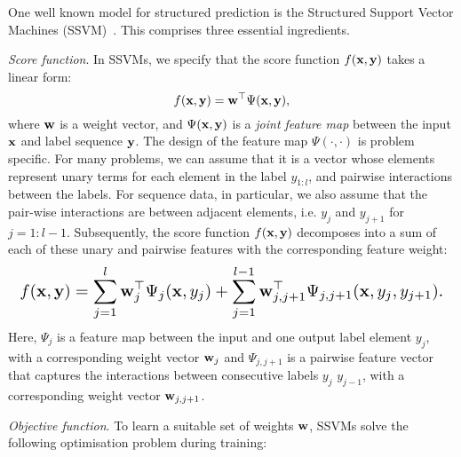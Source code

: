 One well known model for structured prediction is the Structured Support Vector Machines (SSVM)~\cite{joachims2009predicting,tsochantaridis2005large}.
This comprises three essential ingredients.

\emph{Score function}. In SSVMs, we specify that the score function $f(\mathbf{x}, \mathbf{y})$ takes a linear form:
\begin{equation*}
f(\mathbf{x}, \mathbf{y}) = \mathbf{w}^\top \Psi(\mathbf{x}, \mathbf{y}),
\end{equation*}
where $\mathbf{w}$ is a weight vector, and $\Psi(\mathbf{x}, \mathbf{y})$ is a \emph{joint feature map}
between the input $\mathbf{x}$ and label sequence $\mathbf{y}$.
The design of the feature map $\Psi(\cdot,\cdot)$ is problem specific.
For many problems, we can assume that it is a vector whose elements represent unary
 terms for each element in the label $y_{1:l}$, and pairwise interactions between the labels.
 For sequence data, in particular, we also assume that the pair-wise interactions are between
 adjacent elements, i.e. $y_j$ and $y_{j+1}$ for $j=1:l-1$.
 Subsequently, the score function $f(\mathbf{x},\mathbf{y})$ decomposes into a sum of
 each of these unary and pairwise features with the corresponding feature weight:
\begin{equation}
\label{eq:jointfeature}
\resizebox{0.99\linewidth}{!}{$\displaystyle
f(\x, \y) =  %
\sum_{j=1}^l \w_j^\top \Psi_j(\x, y_j)
  + \sum_{j=1}^{l-1} \w_{j,j+1}^\top \Psi_{j,j+1}(\x, y_{j}, y_{j+1}). %
  $}
\end{equation}
Here, $\Psi_j$ is a feature map between the input and one output label element $y_j$, with a corresponding weight vector $\mathbf{w}_j$
and $\Psi_{j,j+1}$ is a pairwise feature vector that captures the interactions between consecutive labels $y_j$ $y_{j-1}$,
with a corresponding weight vector $\mathbf{w}_{j,j+1}$.

\emph{Objective function}.
To learn a suitable set of weights $\mathbf{w}$, SSVMs solve the following optimisation problem during training:

